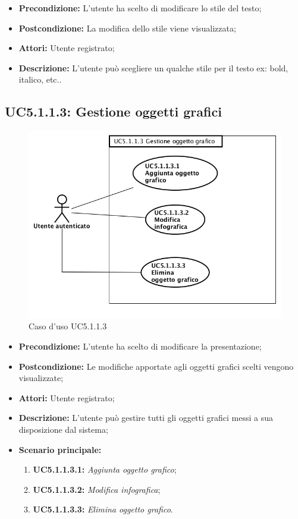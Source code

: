 \begin{itemize}
	\item \textbf{Precondizione:} L'utente ha scelto di modificare lo stile del testo;
	\item \textbf{Postcondizione:} La modifica dello stile viene visualizzata;
	\item \textbf{Attori:} Utente registrato;
	\item \textbf{Descrizione:} L'utente può scegliere un qualche stile per il testo ex: bold, italico, etc..
\end{itemize}

\newpage
\subsection{ UC5.1.1.3: Gestione oggetti grafici}

\begin{figure}[h]
	\begin{center}
	\includegraphics[scale=0.6]{diagram/UC5-1-1-3.png}
	\caption{Caso d'uso UC5.1.1.3}
	\end{center}
\end{figure}
\begin{itemize}
	\item \textbf{Precondizione:} L'utente ha scelto di modificare la presentazione;
	\item \textbf{Postcondizione:} Le modifiche apportate agli oggetti grafici scelti vengono visualizzate;
	\item \textbf{Attori:} Utente registrato;
	\item \textbf{Descrizione:} L'utente può gestire tutti gli oggetti grafici messi a sua disposizione dal sistema;
	\item \textbf{Scenario principale:}
	\begin{enumerate}
		\item \textbf{ UC5.1.1.3.1:} \textit{ Aggiunta oggetto grafico};
		\item \textbf{ UC5.1.1.3.2:} \textit{ Modifica infografica};
		\item \textbf{ UC5.1.1.3.3:} \textit{ Elimina oggetto grafico}.
	\end{enumerate}
\end{itemize}

